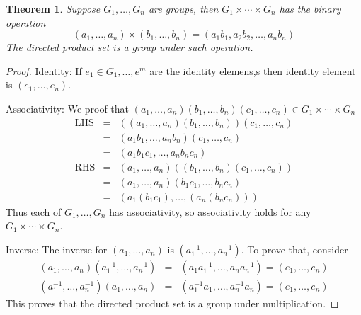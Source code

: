 \documentclass{article}
\theoremstyle{MyNonumberplain}
\theoremstyle{break}
\newtheorem*{proof}{Proof. }
\newcommand{\tmop}{\text}
\theoremstyle{break}
\newtheorem{theorem}{Theorem}[section]
\theoremstyle{break}
\theoremstyle{definition}
\theoremstyle{break}
\begin{document}
\begin{thmbox}
    \begin{theorem}
        Suppose $G_1, \ldots, G_n$ are groups, then $G_1 \times \cdots \times G_n$ has
the binary operation
\[ (a_1, \ldots, a_n) \times (b_1, \ldots, b_n) = (a_1 b_1, a_2 b_2, \ldots,
   a_n b_n) \]
The directed product set is a group under such operation. 
    \end{theorem}
    \begin{prfbox}
        \begin{proof}
            Identity: If $e_1 \in G_1, \ldots, e^m$ are the identity elemens,s then
            identity element is $(e_1, \ldots, e_n) .$

            Associativity: We proof that $(a_1, \ldots, a_n) (b_1, \ldots, b_n) (c_1,
            \ldots, c_n) \in G_1 \times \cdots \times G_n$
            \begin{eqnarray*}
            \tmop{LHS} & = & ((a_1, \ldots, a_n) (b_1, \ldots, b_n)) (c_1, \ldots,
            c_n)\\
            & = & (a_1 b_1, \ldots, a_n b_n) (c_1, \ldots, c_n)\\
            & = & (a_1 b_1 c_1, \ldots, a_n b_n c_n)\\
            \tmop{RHS} & = & (a_1, \ldots, a_n) ((b_1, \ldots, b_n) (c_1, \ldots,
            c_n))\\
            & = & (a_1, \ldots, a_n) (b_1 c_1, \ldots, b_n c_n)\\
            & = & (a_1 (b_1 c_1), \ldots, (a_n (b_n c_n)))
            \end{eqnarray*}
            Thus each of $G_1, \ldots, G_n$ has associativity, so associativity holds for
            any $G_1 \times \cdots \times G_n$.

            Inverse: The inverse for $(a_1, \ldots, a_n)$ is $(a_1^{- 1}, \ldots, a_n^{-
            1})$. To prove that, consider
            \begin{eqnarray*}
            (a_1, \ldots, a_n) (a_1^{- 1}, \ldots, a_n^{- 1}) & = & (a_1 a^{- 1}_1,
            \ldots, a_n a_n^{- 1}) = (e_1, \ldots, e_n)\\
            (a_1^{- 1}, \ldots, a_n^{- 1}) (a_1, \ldots, a_n) & = & (a_1^{- 1} a_1,
            \ldots, a_n^{- 1} a_n) = (e_1, \ldots, e_n)
            \end{eqnarray*}
            This proves that the directed product set is a group under multiplication.
        \end{proof}
    \end{prfbox}
\end{thmbox}
\end{document}
